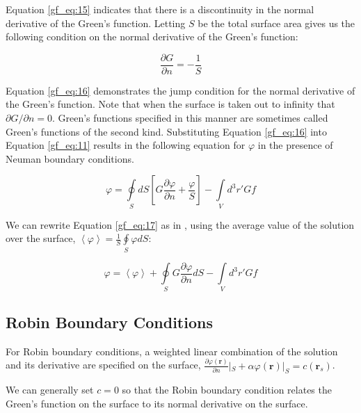 Equation \ref{gf_eq:15} indicates that there is a discontinuity in the normal derivative of the Green's function. Letting $S$ be the total surface area gives us the following condition on the normal derivative of the Green's function:

\begin{equation}
\frac{\partial G}{\partial n} = -\frac{1}{S}
\label{gf_eq:16}
\end{equation}
\renewcommand{\baselinestretch}{2} \small\normalsize

Equation \ref{gf_eq:16} demonstrates the jump condition for the normal derivative of the Green's function. Note that when the surface is taken out to infinity that $\partial G/\partial n = 0$. Green's functions specified in this manner are sometimes called Green's functions of the second kind. Substituting Equation \ref{gf_eq:16} into Equation \ref{gf_eq:11} results in the following equation for $\varphi$ in the presence of Neuman boundary conditions.

\begin{equation}
\boxed{\varphi = \oint\limits_{S}dS\left[G\frac{\partial \varphi}{\partial n} + \frac{\varphi}{S} \right] -\int\limits_{V}d^3r' Gf}
\label{gf_eq:17}
\end{equation}
\renewcommand{\baselinestretch}{2} \small\normalsize

We can rewrite Equation \ref{gf_eq:17} as in \cite{jackson_classical_em}, using the average value of the solution over the surface, $\left< \varphi\right> = \frac{1}{S}\oint\limits_{S}\varphi dS$:

\begin{equation}
\boxed{\varphi = \left<\varphi \right> + \oint\limits_{S}G\frac{\partial \varphi}{\partial n}dS  -\int\limits_{V}d^3r' Gf}
\label{gf_eq:18}
\end{equation}
\renewcommand{\baselinestretch}{2} \small\normalsize

\subsection {Robin Boundary Conditions}
For Robin boundary conditions, a weighted linear combination of the solution and its derivative are specified on the surface, $\frac{\partial\varphi\left(\mathbf{r}\right)}{\partial n}|_{S} +\alpha\varphi\left(\mathbf{r}\right) |_{S}= c\left(\mathbf{r}_s\right)$. 

We can generally set $c=0$ so that the Robin boundary condition relates the Green's function on the surface to its normal derivative on the surface.

